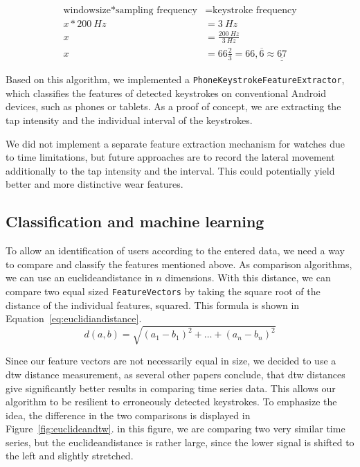 \begin{equation}\label{eq:windowsize}\begin{split}
\textrm{windowsize} * \textrm{sampling frequency} & = \textrm{keystroke frequency}\\
x * \SI{200}{Hz} & = \SI{3}{Hz}\\
x & = \frac{\SI{200}{Hz}}{\SI{3}{Hz}}\\
x & = 66 \frac{2}{3} = 66,\overline{6} \approx \underline{\underline{67}}
\end{split}\end{equation}

Based on this algorithm, we implemented a \lstinline$PhoneKeystrokeFeatureExtractor$,
which classifies the features of detected keystrokes on conventional Android devices, such as phones or tablets. As a proof of concept, we are extracting the tap intensity and the individual interval of the keystrokes.
    
We did not implement a separate feature extraction mechanism for watches due to time limitations, but future approaches are to record the lateral movement additionally to the tap intensity and the interval. This could potentially yield better and more distinctive wear features.

\subsection{Classification and machine learning}
To allow an identification of users according to the entered data, we need a way to compare and classify the features mentioned above. 
As comparison algorithms, we can use an \gls{euclideandistance} in $n$ dimensions. With this distance, we can compare two equal sized \lstinline$FeatureVectors$ by taking the square root of the distance of the individual features, squared. This formula is shown in Equation~\ref{eq:euclidiandistance}.
\begin{equation}\label{eq:euclidiandistance}
d(a, b) = \sqrt{(a_1 - b_1)^2 + \ldots + (a_n - b_n)^2}
\end{equation}

Since our feature vectors are not necessarily equal in size, we decided to use a \gls{dtw} distance measurement, as several other papers conclude, that \gls{dtw} distances give significantly better results in comparing time series data\cite{ding2008querying}. This allows our algorithm to be resilient to erroneously detected keystrokes. To emphasize the idea, the difference in the two comparisons is displayed in Figure~\ref{fig:euclideandtw}. in this figure, we are comparing two very similar time series, but the \gls{euclideandistance} is rather large, since the lower signal is shifted to the left and slightly stretched.

